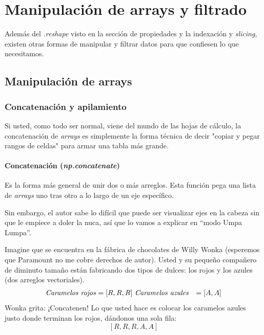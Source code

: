 \section{Manipulación de arrays y filtrado}

Además del \textit{.reshape} visto en la sección de propiedades y la indexación y \textit{slicing}, existen otras formas de manipular y filtrar datos para que confiesen lo que necesitamos.

\subsection{Manipulación de arrays}

\subsubsection{Concatenación y apilamiento}

Si usted, como todo ser normal, viene del mundo de las hojas de cálculo, la concatenación de \textit{arrays} es simplemente la forma técnica de decir "copiar y pegar rangos de celdas" para armar una tabla más grande.

\paragraph{Concatenación (\textit{np.concatenate})}

Es la forma más general de unir dos o más arreglos. Esta función pega una lista de \textit{arrays} uno tras otro a lo largo de un eje específico.

Sin embargo, el autor sabe lo difícil que puede ser visualizar ejes en la cabeza sin que le empiece a doler la nuca, así que lo vamos a explicar en ``modo Umpa Lumpa''.

\begin{ejemplo}
Imagine que se encuentra en la fábrica de chocolates de Willy Wonka (esperemos que Paramount no me cobre derechos de autor). Usted y su pequeño compañero de diminuto tamaño están fabricando dos tipos de dulces: los rojos y los azules (dos arreglos vectoriales).
$$
\begin{aligned}
\text{\textit{Caramelos rojos}} &= [R, R, R] \
\text{\textit{Caramelos azules}} &= [A, A]
\end{aligned}
$$
Wonka grita: ¡Concatenen! Lo que usted hace es colocar los caramelos azules justo donde terminan los rojos, dándonos una sola fila:
\[
\left[R, R, R, A, A\right]
\]
\end{ejemplo}

